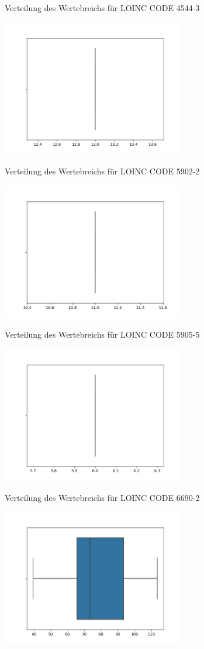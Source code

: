\documentclass[12pt,a4paper,toc=bibliographynumbered,toc=indenttextentries]{scrreprt}
\begin{document}
\begin{center}
			\small{Verteilung des Wertebreichs für LOINC CODE 4544-3}
			
			\includegraphics[width=8cm]{Graphs/5902-2.png}
			
			\small{Verteilung des Wertebreichs für LOINC CODE 5902-2}
			
			\includegraphics[width=8cm]{Graphs/5905-5.png}
			
			\small{Verteilung des Wertebreichs für LOINC CODE 5905-5}
			
			\includegraphics[width=8cm]{Graphs/6690-2.png}
			
			\small{Verteilung des Wertebreichs für LOINC CODE 6690-2}
			
			\includegraphics[width=8cm]{Graphs/6768-6.png}
			

\end{center}
\end{document}
